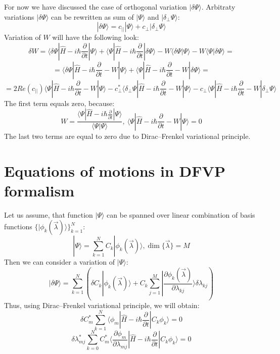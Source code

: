 \documentclass[a4paper,14pt]{extarticle}
\begin{document}
For now we have discussed the case of orthogonal variation $|\delta\Psi\rangle$. 
Arbitraty variations $|\delta\Psi\rangle$ can be rewritten as sum of $|\Psi\rangle$ and $|\delta_{\perp}\Psi\rangle$:
$$|\delta\Psi\rangle = c_{||}|\Psi\rangle + c_{\perp}|\delta_{\perp}\Psi\rangle$$
Variation of $W$ will have the following look:
$$\delta W = \langle\delta\Psi|\hat{H}-i\hbar\frac{\partial}{\partial t}|\Psi\rangle + %
	     \langle\Psi|\hat{H}-i\hbar\frac{\partial}{\partial t}|\delta\Psi\rangle - 
	     W\langle\delta\Psi|\Psi\rangle - W\langle\Psi|\delta\Psi\rangle = $$
$$ = \langle\delta\Psi|\hat{H}-i\hbar\frac{\partial}{\partial t}-W|\Psi\rangle + %
     \langle\Psi|\hat{H}-i\hbar\frac{\partial}{\partial t}-W|\delta\Psi\rangle = $$
$$ = 2\mathit{Re}(c_{||})\langle\Psi|\hat{H}-i\hbar\frac{\partial}{\partial t}-W|\Psi\rangle - %
     c_{\perp}^*\langle\delta_{\perp}\Psi|\hat{H}-i\hbar\frac{\partial}{\partial t}-W|\Psi\rangle - %
     c_{\perp}\langle\Psi|\hat{H}-i\hbar\frac{\partial}{\partial t}-W|\delta_{\perp}\Psi\rangle $$
The first term equals zero, because:
$$W = \frac{\langle\Psi|\hat{H}-i\hbar\frac{\partial}{\partial t}|\Psi\rangle}{\langle\Psi|\Psi\rangle},\ %
      \langle\Psi|\hat{H}-i\hbar\frac{\partial}{\partial t}-W|\Psi\rangle = 0$$
The last two terms are equal to zero due to Dirac--Frenkel variational principle.

\section{Equations of motions in DFVP formalism}
Let us assume, that function $|\Psi\rangle$ can be spanned over linear combination of basis functions $\{|\phi_k(\vec{\lambda})\rangle\}_{k=1}^N$:
$$|\Psi\rangle = \sum_{k=1}^NC_k|\phi_k(\vec{\lambda})\rangle, \dim\{\vec{\lambda}\} = M$$
Then we can consider a variation of $|\Psi\rangle$:
$$|\delta\Psi\rangle = \sum_{k=1}^N \left( \delta C_k|\phi_k(\vec{\lambda})\rangle + %
					   C_k\sum_{j=1}^M|\frac{\partial\phi_k(\vec{\lambda})}{\partial\lambda_{kj}}\rangle\delta\lambda_{kj} \right)$$
Thus, using Dirac--Frenkel variational principle, we will obtain:
$$\delta C_m^*\sum_{k=1}^N\langle\phi_m|\hat{H}-i\hbar\frac{\partial}{\partial t}|C_k\phi_k\rangle=0$$
$$\delta\lambda_{mj}^*\sum_{k=0}^NC_m^*\langle\frac{\partial\phi_m}{\partial\lambda_{mj}}|\hat{H}-i\hbar\frac{\partial}{\partial t}|C_k\phi_k\rangle = 0$$
\end{document}
